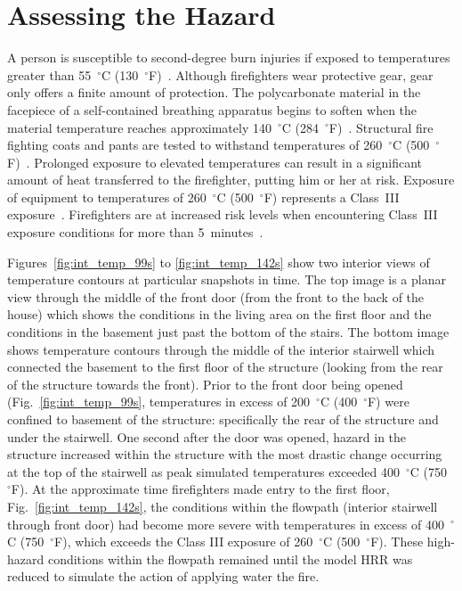 \documentclass[12pt,oneside]{book}
\begin{document}
\clearpage

\section{Assessing the Hazard}
\label{assessing_hazard}
A person is susceptible to second-degree burn injuries if exposed to temperatures greater than 55~$^{\circ}$C (130~$^{\circ}$F)~\cite{contactburn}. Although firefighters wear protective gear, gear only offers a finite amount of protection. The polycarbonate material in the facepiece of a self-contained breathing apparatus begins to soften when the material temperature reaches approximately 140~$^{\circ}$C (284~$^{\circ}$F)~\cite{mensch2011emergency}. Structural fire fighting coats and pants are tested to withstand temperatures of 260~$^{\circ}$C (500~$^{\circ}$F)~\cite{nfpa2013standard}. Prolonged exposure to elevated temperatures can result in a significant amount of heat transferred to the firefighter, putting him or her at risk. Exposure of equipment to temperatures of 260~$^{\circ}$C (500~$^{\circ}$F) represents a Class~III exposure~\cite{Donnelly2006}. Firefighters are at increased risk levels when encountering Class~III exposure conditions for more than 5~minutes~\cite{Donnelly2006}.

Figures~\ref{fig:int_temp_99s} to \ref{fig:int_temp_142s} show two interior views of temperature contours at particular snapshots in time. The top image is a planar view through the middle of the front door (from the front to the back of the house) which shows the conditions in the living area on the first floor and the conditions in the basement just past the bottom of the stairs. The bottom image shows temperature contours through the middle of the interior stairwell which connected the basement to the first floor of the structure (looking from the rear of the structure towards the front). Prior to the front door being opened (Fig.~\ref{fig:int_temp_99s}, temperatures in excess of 200~$^{\circ}$C (400~$^{\circ}$F) were confined to basement of the structure: specifically the rear of the structure and under the stairwell. One second after the door was opened, hazard in the structure increased within the structure with the most drastic change occurring at the top of the stairwell as peak simulated temperatures exceeded 400~$^{\circ}$C (750~$^{\circ}$F). At the approximate time firefighters made entry to the first floor, Fig.~\ref{fig:int_temp_142s}, the conditions within the flowpath (interior stairwell through front door) had become more severe with temperatures in excess of 400~$^{\circ}$C (750~$^{\circ}$F), which exceeds the Class III exposure of 260~$^{\circ}$C (500~$^{\circ}$F). These high-hazard conditions within the flowpath remained until the model HRR was reduced to simulate the action of applying water the fire. 
\end{document}

